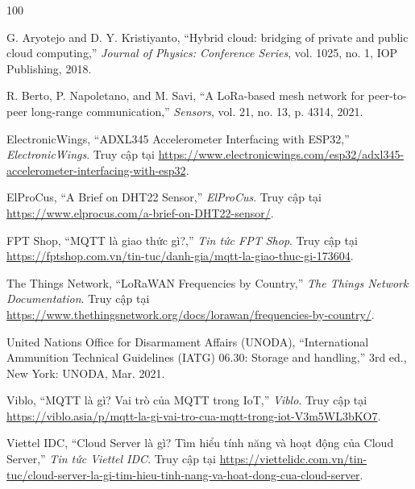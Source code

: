 \normalfont
\begin{thebibliography}{100}
\label{bibliography}

G. Aryotejo and D. Y. Kristiyanto, ``Hybrid cloud: bridging of private and public cloud computing,'' \textit{Journal of Physics: Conference Series}, vol. 1025, no. 1, IOP Publishing, 2018.

R. Berto, P. Napoletano, and M. Savi, ``A LoRa-based mesh network for peer-to-peer long-range communication,'' \textit{Sensors}, vol. 21, no. 13, p. 4314, 2021.

ElectronicWings, ``ADXL345 Accelerometer Interfacing with ESP32,'' \textit{ElectronicWings}. Truy cập tại \url{https://www.electronicwings.com/esp32/adxl345-accelerometer-interfacing-with-esp32}.

ElProCus, ``A Brief on DHT22 Sensor,'' \textit{ElProCus}. Truy cập tại \url{https://www.elprocus.com/a-brief-on-DHT22-sensor/}.

FPT Shop, ``MQTT là giao thức gì?,'' \textit{Tin tức FPT Shop}. Truy cập tại \url{https://fptshop.com.vn/tin-tuc/danh-gia/mqtt-la-giao-thuc-gi-173604}.

The Things Network, ``LoRaWAN Frequencies by Country,'' \textit{The Things Network Documentation}. Truy cập tại \url{https://www.thethingsnetwork.org/docs/lorawan/frequencies-by-country/}.

United Nations Office for Disarmament Affairs (UNODA), ``International Ammunition Technical Guidelines (IATG) 06.30: Storage and handling,'' 3rd ed., New York: UNODA, Mar. 2021.

Viblo, ``MQTT là gì? Vai trò của MQTT trong IoT,'' \textit{Viblo}. Truy cập tại \url{https://viblo.asia/p/mqtt-la-gi-vai-tro-cua-mqtt-trong-iot-V3m5WL3bKO7}.

Viettel IDC, ``Cloud Server là gì? Tìm hiểu tính năng và hoạt động của Cloud Server,'' \textit{Tin tức Viettel IDC}. Truy cập tại \url{https://viettelidc.com.vn/tin-tuc/cloud-server-la-gi-tim-hieu-tinh-nang-va-hoat-dong-cua-cloud-server}.

\end{thebibliography}